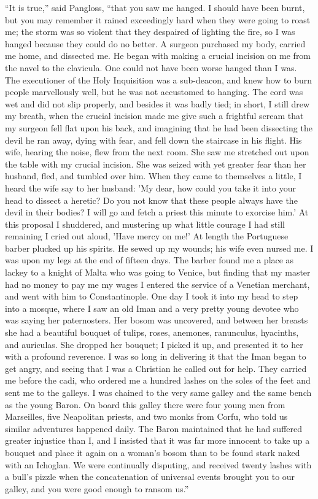 ``It is true,'' said Pangloss, ``that you saw me hanged. I should have been burnt, but you may remember it rained exceedingly hard when they were going to roast me; the storm was so violent that they despaired of lighting the fire, so I was hanged because they could do no better. A surgeon purchased my body, carried me home, and dissected me. He began with making a crucial incision on me from the navel to the clavicula. One could not have been worse hanged than I was. The executioner of the Holy Inquisition was a sub-deacon, and knew how to burn people marvellously well, but he was not accustomed to hanging. The cord was wet and did not slip properly, and besides it was badly tied; in short, I still drew my breath, when the crucial incision made me give such a frightful scream that my surgeon fell flat upon his back, and imagining that he had been dissecting the devil he ran away, dying with fear, and fell down the staircase in his flight. His wife, hearing the noise, flew from the next room. She saw me stretched out upon the table with my crucial incision. She was seized with yet greater fear than her husband, fled, and tumbled over him. When they came to themselves a little, I heard the wife say to her husband: 'My dear, how could you take it into your head to dissect a heretic? Do you not know that these people always have the devil in their bodies? I will go and fetch a priest this minute to exorcise him.' At this proposal I shuddered, and mustering up what little courage I had still remaining I cried out aloud, 'Have mercy on me!' At length the Portuguese barber plucked up his spirits. He sewed up my wounds; his wife even nursed me. I was upon my legs at the end of fifteen days. The barber found me a place as lackey to a knight of Malta who was going to Venice, but finding that my master had no money to pay me my wages I entered the service of a Venetian merchant, and went with him to Constantinople. One day I took it into my head to step into a mosque, where I saw an old Iman and a very pretty young devotee who was saying her paternosters. Her bosom was uncovered, and between her breasts she had a beautiful bouquet of tulips, roses, anemones, ranunculus, hyacinths, and auriculas. She dropped her bouquet; I picked it up, and presented it to her with a profound reverence. I was so long in delivering it that the Iman began to get angry, and seeing that I was a Christian he called out for help. They carried me before the cadi, who ordered me a hundred lashes on the soles of the feet and sent me to the galleys. I was chained to the very same galley and the same bench as the young Baron. On board this galley there were four young men from Marseilles, five Neapolitan priests, and two monks from Corfu, who told us similar adventures happened daily. The Baron maintained that he had suffered greater injustice than I, and I insisted that it was far more innocent to take up a bouquet and place it again on a woman's bosom than to be found stark naked with an Ichoglan. We were continually disputing, and received twenty lashes with a bull's pizzle when the concatenation of universal events brought you to our galley, and you were good enough to ransom us.''

